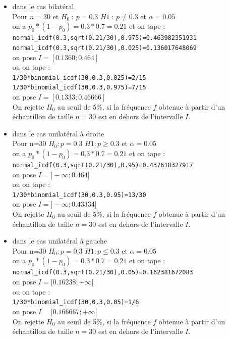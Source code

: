 \documentclass[a4paper,11pt]{book}
\begin{document}
\begin{itemize}
\item dans le cas bilat\'eral \\
Pour  $n=30$ et  $H_0\  : \ p=0.3$ $H1\  :\  p \neq 0.3$ et $\alpha=0.05$\\
on a $p_0*(1-p_0)=0.3*0.7=0.21$ et on tape :\\
{\tt normal\_icdf(0.3,sqrt(0.21/30),0.975)=0.463982351931}\\
{\tt normal\_icdf(0.3,sqrt(0.21/30),0.025)=0.136017648069}\\
on pose $I=[0.1360;0.464]$\\
ou on tape :\\
{\tt 1/30*binomial\_icdf(30,0.3,0.025)=2/15}\\
{\tt 1/30*binomial\_icdf(30,0.3,0.975)=7/15}\\
on pose $I=[0.1333;0.46666]$\\
On rejette $H_0$ au seuil de 5\%, si la fr\'equence $f$ obtenue \`a partir 
d'un \'echantillon de taille $n=30$ est en dehors de l'intervalle $I$.
\item  dans le cas unilat\'eral \`a droite\\
Pour  n=30 $H_0 :p=0.3$ $H1 : p \geq 0.3$ et $\alpha=0.05$\\
on a $p_0*(1-p_0)=0.3*0.7=0.21$ et on tape :\\
{\tt normal\_icdf(0.3,sqrt(0.21/30),0.95)=0.437618327917}\\
on pose $I=]-\infty;0.464]$\\
ou on tape :\\
{\tt 1/30*binomial\_icdf(30,0.3,0.95)=13/30}\\
on pose  $I=]-\infty;0.43334]$\\
On rejette $H_0$ au seuil de 5\%, si la fr\'equence $f$ obtenue \`a partir 
d'un \'echantillon de taille $n=30$ est en dehors de l'intervalle $I$.
\item  dans le cas unilat\'eral \`a gauche\\
Pour  n=30 $H_0 :p=0.3$ $H1 : p \leq 0.3$ et $\alpha=0.05$\\
on a $p_0*(1-p_0)=0.3*0.7=0.21$ et on tape :\\
{\tt normal\_icdf(0.3,sqrt(0.21/30),0.05)=0.162381672083}\\
on pose $I=[0.16238;+\infty[$\\
ou on tape :\\
{\tt 1/30*binomial\_icdf(30,0.3,0.05)=1/6}\\
on pose $I=[0.166667;+\infty[$\\
On rejette $H_0$ au seuil de 5\%, si la fr\'equence $f$ obtenue \`a partir 
d'un \'echantillon de taille $n=30$ est en dehors de l'intervalle $I$.
\end{itemize}
\end{document}
